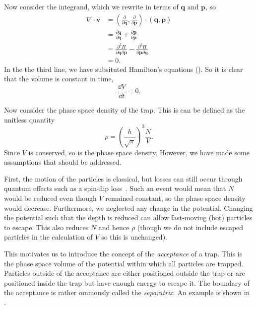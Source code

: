 Now consider the integrand, which we rewrite in terms of $\mathbf{q}$ and
$\mathbf{p}$, so
%
\begin{align}
  \nabla \cdot \mathbf{v} &= \left(\frac{\partial}{\partial \mathbf{q}},
  \frac{\partial}{\partial \mathbf{p}}\right) \cdot \left(\dot{\mathbf{q}},
  \dot{\mathbf{p}}\right) \\
  &= \frac{\partial \dot{\mathbf{q}}}{\partial \mathbf{q}} +
  \frac{\partial \dot{\mathbf{p}}}{\partial \mathbf{p}} \\
  & = \frac{\partial^2 H}{\partial \mathbf{q} \partial \mathbf{p}}
  - \frac{\partial^2 H}{\partial \mathbf{p} \partial \mathbf{q}} \\
  & = 0.
\end{align}
In the the third line, we have subsituted Hamilton's equations
().  So it is clear that the volume is constant in
time,
%
\begin{equation}
  \frac{\dd V}{\dd t} = 0.
\end{equation}

Now consider the phase space density of the trap. This is can be defined as the
unitless quantity~\cite{PhysRevA.52.1423}
%
\begin{equation}
  \rho = \left(\frac{h}{\sqrt{\pi}}\right)^3 \frac{N}{V}.
\end{equation}
%
Since $V$ is conserved, so is the phase space density. However, we have made
some assumptions that should be addressed.

First, the motion of the particles is classical, but losses can still occur
through quantum effects such as a spin-flip loss~\cite{PhysRevLett.51.1336}.
Such an event would mean that $N$ would be reduced even though $V$ remained
constant, so the phase space density would decrease. Furthermore, we neglected
any change in the potential.  Changing the potential such that the depth is
reduced can allow fast-moving (hot) particles to escape. This also reduces $N$
and hence $\rho$ (though we do not include escaped particles in the calculation
of $V$ so this is unchanged).

This motivates us to introduce the concept of the \emph{acceptance} of a trap.
This is the phase space volume of the potential within which all particles are
trapped. Particles outside of the acceptance are either positioned outside the
trap or are positioned inside the trap but have enough energy to escape it. The
boundary of the acceptance is rather ominously called the \emph{separatrix}. An
example is shown in .~\cite{Lichtenberg1969,
HanHand1998}

